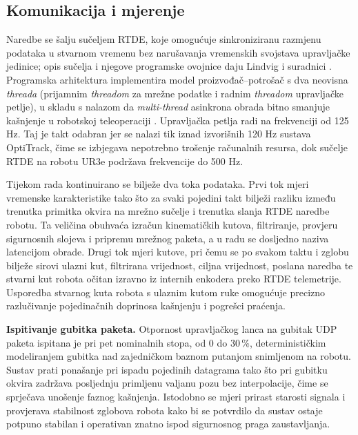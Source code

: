 \subsection{Komunikacija i mjerenje}

Naredbe se šalju sučeljem RTDE, koje omogućuje sinkroniziranu razmjenu podataka u stvarnom vremenu bez narušavanja vremenskih svojstava upravljačke jedinice; opis sučelja i njegove programske ovojnice daju Lindvig i suradnici \cite{lindvig2025}. Programska arhitektura implementira model proizvođač--potrošač s dva neovisna \textit{threada} (prijamnim \textit{threadom} za mrežne podatke i radnim \textit{threadom} upravljačke petlje), u skladu s nalazom da \textit{multi-thread} asinkrona obrada bitno smanjuje kašnjenje u robotskoj teleoperaciji \cite[str.~2]{zainudin2025}. Upravljačka petlja radi na frekvenciji od 125 Hz. Taj je takt odabran jer se nalazi tik iznad izvorišnih 120 Hz sustava OptiTrack, čime se izbjegava nepotrebno trošenje računalnih resursa, dok sučelje RTDE na robotu UR3e podržava frekvencije do 500 Hz.

Tijekom rada kontinuirano se bilježe dva toka podataka. Prvi tok mjeri vremenske karakteristike tako što za svaki pojedini takt bilježi razliku između trenutka primitka okvira na mrežno sučelje i trenutka slanja RTDE naredbe robotu. Ta veličina obuhvaća izračun kinematičkih kutova, filtriranje, provjeru sigurnosnih slojeva i pripremu mrežnog paketa, a u radu se dosljedno naziva latencijom obrade. Drugi tok mjeri kutove, pri čemu se po svakom taktu i zglobu bilježe sirovi ulazni kut, filtrirana vrijednost, ciljna vrijednost, poslana naredba te stvarni kut robota očitan izravno iz internih enkodera preko RTDE telemetrije. Usporedba stvarnog kuta robota s ulaznim kutom ruke omogućuje precizno razlučivanje pojedinačnih doprinosa kašnjenju i pogrešci praćenja.

\textbf{Ispitivanje gubitka paketa.} Otpornost upravljačkog lanca na gubitak UDP paketa ispitana je pri pet nominalnih stopa, od 0 do 30\,\%, determinističkim modeliranjem gubitka nad zajedničkom baznom putanjom snimljenom na robotu. Sustav prati ponašanje pri ispadu pojedinih datagrama tako što pri gubitku okvira zadržava posljednju primljenu valjanu pozu bez interpolacije, čime se sprječava unošenje faznog kašnjenja. Istodobno se mjeri prirast starosti signala i provjerava stabilnost zglobova robota kako bi se potvrdilo da sustav ostaje potpuno stabilan i operativan znatno ispod sigurnosnog praga zaustavljanja.

\FloatBarrier
